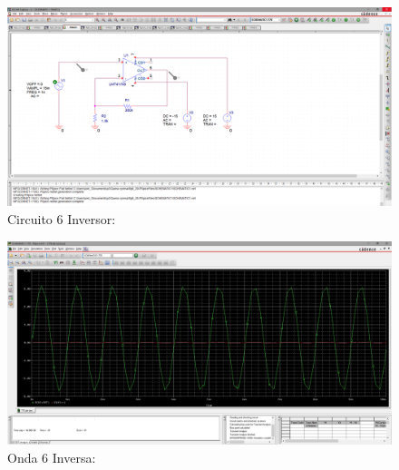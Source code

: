 \documentclass[letterpaper]{article}
\begin{document}
\begin{figure}[htbp]
    \centering
    \includegraphics[width=18cm]{IMG/cir(7).png}
    \caption{Circuito 6 Inversor:}
    \label{fig:my_label}
\end{figure}
\begin{figure}[htbp]
    \centering
    \includegraphics[width=18cm]{IMG/ond(6).png}
    \caption{Onda 6 Inversa: }
    \label{fig:my_label}
\end{figure}
\end{document}
